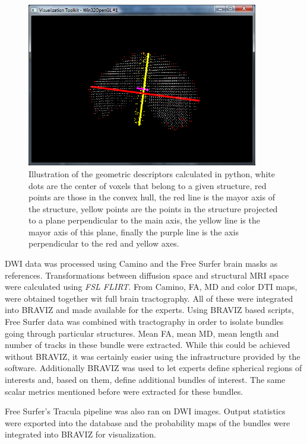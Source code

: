 \begin{figure}
	\centering
		\includegraphics[width=0.9\textwidth]{figures/kmc400/desc_4}
	\caption{Illustration of the geometric descriptors calculated in python, white dots are the center of voxels that belong to a given structure, red points are those in the convex hull, the red line is the mayor axis of the structure, yellow points are the points in the structure projected to a plane perpendicular to the main axis, the yellow line is the mayor axis of this plane, finally the purple line is the axis perpendicular to the red and yellow axes.}
	\label{fig_jth_descs}
\end{figure}

DWI data was processed using Camino and the Free Surfer brain masks as references. Transformations between diffusion space and structural MRI space were calculated using \emph{FSL FLIRT}. From Camino, FA, MD and color DTI maps, were obtained together wit full brain tractography. All of these were integrated into BRAVIZ and made available for the experts. Using BRAVIZ based scripts, Free Surfer data was combined with tractography in order to isolate bundles going through particular structures. Mean FA, mean MD, mean length and number of tracks in these bundle were extracted.  While this could be achieved without BRAVIZ, it was certainly easier using the infrastructure provided by the software. Additionally BRAVIZ was used to let experts define spherical regions of interests and, based on them, define additional bundles of interest. The same scalar metrics mentioned before were extracted for these bundles. 

Free Surfer's Tracula pipeline was also ran on DWI images. Output statistics were exported into the database and the probability maps of the bundles were integrated into BRAVIZ for visualization. 

